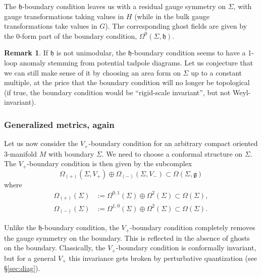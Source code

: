 \documentclass[a4paper]{amsart}
\theoremstyle{plain}
\theoremstyle{definition}
\newtheorem*{rem}{Remark}
\newcommand{\g}{\mathfrak{g}}
\newcommand{\h}{\mathfrak{h}}
\newcommand{\la}{\langle}
\newcommand{\ra}{\rangle}
\begin{document}
The $\h$-boundary condition leaves us with a residual gauge symmetry on $\Sigma$, with gauge transformations taking values in $H$ (while in the bulk gauge transformations take values in $G$). The corresponding ghost fields are given by the 0-form part of the boundary condition, $\Omega^0(\Sigma,\h)$.

\begin{rem}
If $\h$ is not unimodular, the $\h$-boundary condition seems to have a 1-loop anomaly stemming from potential tadpole diagrams. Let us conjecture that we can still make sense of it by choosing an area form on $\Sigma$ up to a constant multiple, at the price that the boundary condition will no longer be topological (if true, the boundary condition would be ``rigid-scale invariant'', but not Weyl-invariant). %
\end{rem}

\subsubsection{Generalized metrics, again}\label{subsubsec:generalized_metrics_bc}
Let us now consider the $V_+$-boundary condition for an arbitrary compact oriented 3-manifold $M$ with boundary $\Sigma$. 
We need to choose a conformal structure on $\Sigma$. 
The $V_+$-boundary condition is then given by the subcomplex
$$\Omega_{(+)}(\Sigma,V_+) \oplus \Omega_{(-)}(\Sigma,V_-) \subset\Omega(\Sigma,\g)$$
where
\begin{align*}
\Omega_{(+)}(\Sigma)&:=\Omega^{0,1}(\Sigma)\oplus\Omega^2(\Sigma)\subset\Omega(\Sigma),\\
\Omega_{(-)}(\Sigma)&:=\Omega^{1,0}(\Sigma)\oplus\Omega^2(\Sigma)\subset\Omega(\Sigma).
\end{align*}


Unlike the $\h$-boundary condition, the $V_+$-boundary condition completely removes the gauge symmetry on the boundary. This is reflected in the absence of ghosts on the boundary. Classically, the $V_+$-boundary condition is conformally invariant, but for a general $V_+$ this invariance gets broken by perturbative quantization (see \S\ref{sec:diag}).
\end{document}
